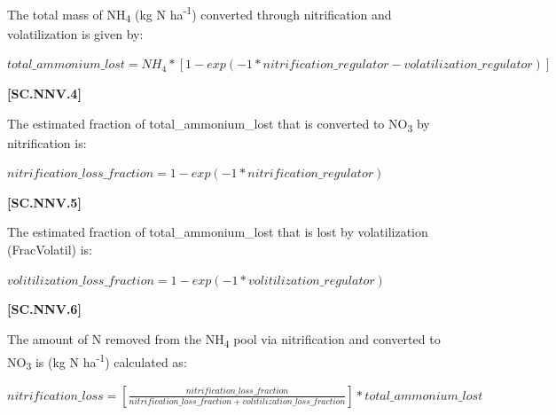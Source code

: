 The total mass of NH\textsubscript{4} (kg N ha\textsuperscript{-1}) converted through nitrification and volatilization is given by:
\vspace{0.5cm}
            
    \begin{center}
 \(total\_ammonium\_lost=NH_4 * [1-exp(-1 *nitrification\_regulator-volatilization\_regulator)]\)
    \end{center}
        \vspace{0.5cm} 
    
            {\raggedleft \textbf{[SC.NNV.4]}\par}
            \vspace{0.5cm}

The estimated fraction of total\_ammonium\_lost that is converted to NO\textsubscript{3} by nitrification is:
\vspace{0.5cm}
            
    \begin{center}
 \(nitrification\_loss\_fraction=1-exp(-1 *nitrification\_regulator)	\)
    \end{center}
        \vspace{0.5cm} 
    
            {\raggedleft \textbf{[SC.NNV.5]}\par}
            \vspace{0.5cm}

The estimated fraction of total\_ammonium\_lost that is lost by volatilization (FracVolatil) is:
\vspace{0.5cm}
            
    \begin{center}
 \(volitilization\_loss\_fraction=1-exp(-1 *volitilization\_regulator)\)
    \end{center}
        \vspace{0.5cm} 
    
            {\raggedleft \textbf{[SC.NNV.6]}\par}
            \vspace{0.5cm}

The amount of N removed from the NH\textsubscript{4} pool via nitrification and converted to NO\textsubscript{3} is (kg N ha\textsuperscript{-1}) calculated as:
\vspace{0.5cm}
            
    \begin{center}
 \(nitrification\_loss=[\frac{nitrification\_loss\_fraction}{nitrification\_loss\_fraction + volitilization\_loss\_fraction}] * total\_ammonium\_lost \)
    \end{center}
        \vspace{0.5cm} 
    
